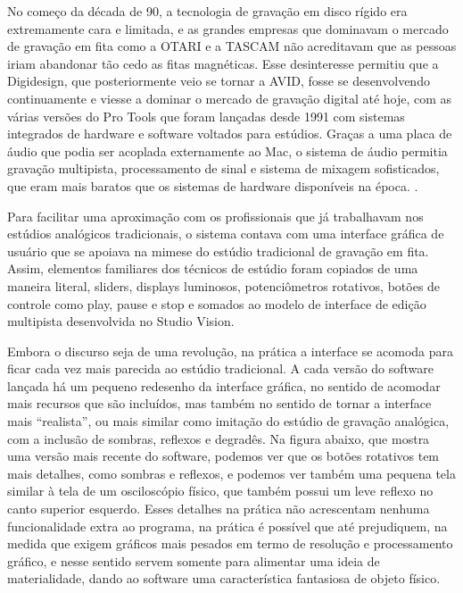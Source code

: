 No começo da década de 90, a tecnologia de gravação em disco rígido era extremamente cara e limitada, e as grandes empresas que dominavam o mercado de gravação em fita como a OTARI e a TASCAM não acreditavam que as pessoas iriam abandonar tão cedo as fitas magnéticas. Esse desinteresse permitiu que a Digidesign, que posteriormente veio se tornar a AVID, fosse se desenvolvendo continuamente e viesse a dominar o mercado de gravação digital até hoje, com as várias versões do Pro Tools que foram lançadas desde 1991 com sistemas integrados de hardware e software voltados para estúdios. Graças a uma placa de áudio que podia ser acoplada externamente ao Mac, o sistema de áudio permitia gravação multipista, processamento de sinal e sistema de mixagem sofisticados, que eram mais baratos que os sistemas de hardware disponíveis na época. \cite{ChrisHalaby2011}.

Para facilitar uma aproximação com os profissionais que já trabalhavam nos estúdios analógicos tradicionais, o sistema contava com uma interface gráfica de usuário que se apoiava na mimese do estúdio tradicional de gravação em fita. Assim, elementos familiares dos técnicos de estúdio foram copiados de uma maneira literal, sliders, displays luminosos, potenciômetros rotativos, botões de controle como play, pause e stop e somados ao modelo de interface de edição multipista desenvolvida no Studio Vision. 

Embora o discurso seja de uma revolução, na prática a interface se acomoda para ficar cada vez mais parecida ao estúdio tradicional. A cada versão do software lançada há um pequeno redesenho da interface gráfica, no sentido de acomodar mais recursos que são incluídos, mas também no sentido de tornar a interface mais “realista”, ou mais similar como imitação do estúdio de gravação analógica, com a inclusão de sombras, reflexos e degradês. Na figura abaixo, que mostra uma versão mais recente do software, podemos ver que os botões rotativos tem mais detalhes, como sombras e reflexos, e podemos ver também uma pequena tela similar à tela de um osciloscópio físico, que também possui um leve reflexo no canto superior esquerdo. Esses detalhes na prática não acrescentam nenhuma funcionalidade extra ao programa, na prática é possível que até prejudiquem, na medida que exigem gráficos mais pesados em termo de resolução e processamento gráfico, e nesse sentido servem somente para alimentar uma ideia de materialidade, dando ao software uma característica fantasiosa de objeto físico. 

